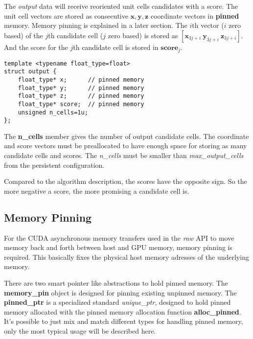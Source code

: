 \documentclass[a4paper,10pt]{article}
\newcommand{\vect}[1]{\mathbf{#1}}
\begin{document}
The \emph{output} data will receive reoriented unit cells candidates with a score. The unit cell vectors are stored as consecutive $\vect{x},\vect{y},\vect{z}$ coordinate vectors in \textbf{pinned} memory. Memory pinning is explained in a later section. The $i$th vector ($i$ zero based) of the $j$th candidate cell ($j$ zero based) is stored as $[\vect{x}_{3j+i}\ \vect{y}_{3j+i}\ \vect{z}_{3j+i}]$. And the score for the $j$th candidate cell is stored in $\vect{score}_j$.
%
\begin{lstlisting}
template <typename float_type=float>
struct output {
    float_type* x;      // pinned memory
    float_type* y;      // pinned memory
    float_type* z;      // pinned memory
    float_type* score;  // pinned memory
    unsigned n_cells=1u;
};
\end{lstlisting}
%
The \textbf{n\_cells} member gives the number of output candidate cells. The coordinate and score vectors must be preallocated to have enough space for storing as many candidate cells and scores. The \emph{n\_cells} must be smaller than \emph{max\_output\_cells} from the persistent configuration.

Compared to the algorithm description, the scores have the opposite sign. So the more negative a score, the more promising a candidate cell is.

\subsection{Memory Pinning}

For the CUDA asynchronous memory transfers used in the \emph{raw} API to move memory back and forth between host and GPU memory, memory pinning is required. This basically fixes the physical host memory adresses of the underlying memory.

There are two smart pointer like abstractions to hold pinned memory. The \textbf{memory\_pin} object is designed for pinning existing unpinned memory. The \textbf{pinned\_ptr} is a specialized standard \emph{unique\_ptr}, designed to hold pinned memory allocated with the pinned memory allocation function \textbf{alloc\_pinned}. It's possible to just mix and match different types for handling pinned memory, only the most typical usage will be described here.
\end{document}
